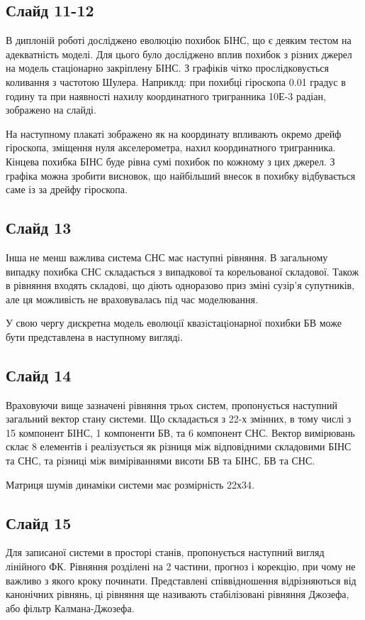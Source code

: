 \documentclass[ukrainian,utf8,simple,floatsubsection, hpadding=1mm,equationsubsection,12pt]{eskdtext}
\begin{document}
\subsection*{Слайд 11-12}
В диплоній роботі досліджено еволюцію похибок БІНС, що є деяким тестом на адекватність моделі. Для цього було досліджено вплив похибок з різних джерел на модель стаціонарно закріплену БІНС. З графіків чітко прослідковується коливання з частотою Шулера. Наприклд: при похибці гіроскопа 0.01 градус в годину та при наявності нахилу координатного тригранника 10Е-3 радіан, зображено на слайді.

На наступному плакаті зображено як на координату впливають окремо дрейф гіроскопа, зміщення нуля акселерометра, нахил координатного тригранника. Кінцева похибка БІНС буде рівна сумі похибок по кожному з цих джерел. З графіка можна зробити висновок, що найбільший внесок в похибку відбувається саме із за дрейфу гіроскопа.

\subsection*{Слайд 13}
Інша не менш важлива система СНС має наступні рівняння. В загальному випадку похибка СНС складається з випадкової та корельованої складової. Також в рівняння входять складові, що діють одноразово приз зміні сузір’я супутників, але ця можливість не враховувалась під час моделювання.

У свою чергу дискретна модель еволюцiї квазiстацiонарної похибки БВ може бути представлена в наступному виглядi.
\subsection*{Слайд 14}

Враховуючи вище зазначені рівняння трьох систем, пропонується наступний загальний вектор стану системи. Що складається з 22-х змінних, в тому числі з 15 компонент БІНС, 1 компоненти БВ, та 6 компонент СНС.
Вектор вимірювань склає 8 елементів і реалізується як різниця між відповідними складовими БІНС та СНС, та різниці між виміріваннями висоти БВ та БІНС, БВ та СНС.

Матриця шумів динаміки системи має розмірність 22х34.

\subsection*{Слайд 15}
Для записаної системи в просторі станів, пропонується наступний вигляд лінійного ФК. Рівняння розділені на 2 частини, прогноз і корекцію, при чому не важливо з якого кроку починати. Представлені співвідношення відрізняються від канонічних рівнянь, ці рівняння ще називають стабілізовані рівняння Джозефа, або фільтр Калмана-Джозефа. 
\end{document}
